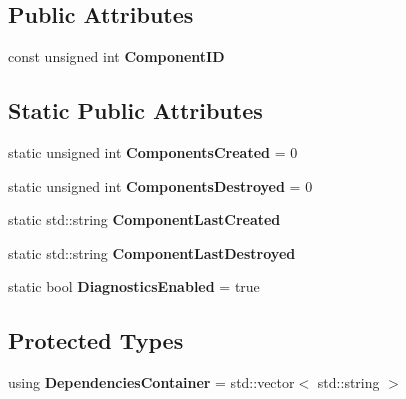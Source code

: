 \subsection*{Public Attributes}
\begin{DoxyCompactItemize}
\item 
\hypertarget{classDCEngine_1_1Component_acdff26be1980d868761e54f32eea6219}{const unsigned int {\bfseries Component\-I\-D}}\label{classDCEngine_1_1Component_acdff26be1980d868761e54f32eea6219}

\end{DoxyCompactItemize}
\subsection*{Static Public Attributes}
\begin{DoxyCompactItemize}
\item 
\hypertarget{classDCEngine_1_1Component_a175738e900b11233bf516905797c23c7}{static unsigned int {\bfseries Components\-Created} = 0}\label{classDCEngine_1_1Component_a175738e900b11233bf516905797c23c7}

\item 
\hypertarget{classDCEngine_1_1Component_afe67576bb93cce3a053b1f8bb25e38ef}{static unsigned int {\bfseries Components\-Destroyed} = 0}\label{classDCEngine_1_1Component_afe67576bb93cce3a053b1f8bb25e38ef}

\item 
\hypertarget{classDCEngine_1_1Component_a839bb8cffb519b1570422772c791c26a}{static std\-::string {\bfseries Component\-Last\-Created}}\label{classDCEngine_1_1Component_a839bb8cffb519b1570422772c791c26a}

\item 
\hypertarget{classDCEngine_1_1Component_a9afe9259d705affe8d816d2f80407993}{static std\-::string {\bfseries Component\-Last\-Destroyed}}\label{classDCEngine_1_1Component_a9afe9259d705affe8d816d2f80407993}

\item 
\hypertarget{classDCEngine_1_1Component_a0d8174578805a0f8486a72d3cba36fb7}{static bool {\bfseries Diagnostics\-Enabled} = true}\label{classDCEngine_1_1Component_a0d8174578805a0f8486a72d3cba36fb7}

\end{DoxyCompactItemize}
\subsection*{Protected Types}
\begin{DoxyCompactItemize}
\item 
\hypertarget{classDCEngine_1_1Component_a7d6a7f58beccc0453b39d113f00f37c2}{using {\bfseries Dependencies\-Container} = std\-::vector$<$ std\-::string $>$}\label{classDCEngine_1_1Component_a7d6a7f58beccc0453b39d113f00f37c2}

\end{DoxyCompactItemize}
